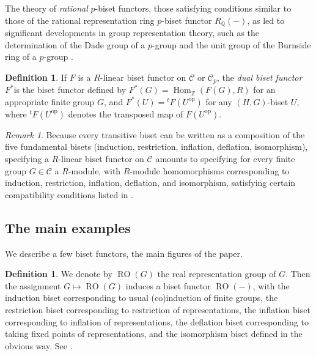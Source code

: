 \documentclass[]{amsart}
\newcommand{\Hom}{\operatorname{Hom}}
\newcommand{\op}{^{\operatorname{op}}}
\newcommand{\on}[1]{\operatorname{#1}}
\newcommand{\calC}{\mathcal{C}}
\newcommand{\bbQ}{\mathbb{Q}}
\newcommand{\bbZ}{\mathbb{Z}}
\newcommand{\RO}{\on{RO}}
\theoremstyle{remark}
\newtheorem{remark}[theorem]{Remark}
\theoremstyle{definition}
\newtheorem{definition}[theorem]{Definition}
\begin{document}
	The theory of \emph{rational} $p$-biset functors, those satisfying conditions similar to those of the rational representation ring $p$-biset functor $R_\bbQ(-)$, as led to significant developments in group representation theory, such as the determination of the Dade group of a $p$-group \cite{Bou06} and the unit group of the Burnside ring of a $p$-group \cite{Y05, Bou07}. 
	
	\begin{definition}
		If $F$ is a $R$-linear biset functor on $\calC$ or $\calC_p$, the \emph{dual biset functor} $F^*$is the biset functor defined by $F^*(G) = \Hom_\bbZ(F(G), R)$ for an appropriate finite group $G$, and $F^*(U) = {}^tF(U\op)$ for any $(H,G)$-biset $U$, where ${}^tF(U\op)$ denotes the transposed map of $F(U\op)$. 
	\end{definition}
	
	\begin{remark}
		Because every transitive biset can be written as a composition of the five fundamental bisets (induction, restriction, inflation, deflation, isomorphism), specifying a $R$-linear biset functor on $\calC$ amounts to specifying for every finite group $G \in \calC$ a $R$-module, with $R$-module homomorphisms corresponding to induction, restriction, inflation, deflation, and isomorphism, satisfying certain compatibility conditions listed in \cite[Subsection 1.1.3]{Bou10}. 
	\end{remark}
	
	\subsection{The main examples} We describe a few biset functors, the main figures of the paper. 
	
	\begin{definition}
		We denote by $\on{RO}(G)$ the real representation group of $G$. Then the assignment $G \mapsto \on{RO}(G)$ induces a biset functor $\RO(-)$, with the induction biset corresponding to usual (co)induction of finite groups, the restriction biset corresponding to restriction of representations, the inflation biset corresponding to inflation of representations, the deflation biset corresponding to taking fixed points of representations, and the isomorphism biset defined in the obvious way. See \cite[Section 3.d]{Yos90}.
	\end{definition}
	
\end{document}
